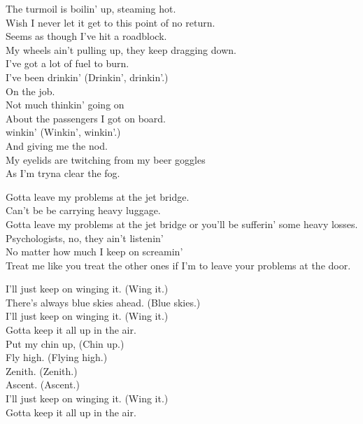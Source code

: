 
The turmoil is boilin' up, steaming hot. \\
Wish I never let it get to this point of no return. \\
Seems as though I've hit a roadblock. \\
My wheels ain't pulling up, they keep dragging down. \\

I've got a lot of fuel to burn. \\
I've been drinkin' (Drinkin', drinkin'.) \\
On the job. \\
Not much thinkin' going on \\
About the passengers I got on board. \\
 winkin' (Winkin', winkin'.) \\
And giving me the nod. \\
My eyelids are twitching from my beer goggles \\
As I'm tryna clear the fog. \\


Gotta leave my problems at the jet bridge. \\
Can't be be carrying heavy luggage. \\
Gotta leave my problems at the jet bridge or you'll be sufferin' some heavy losses. \\
Psychologists, no, they ain't listenin' \\
No matter how much I keep on screamin' \\
Treat me like you treat the other ones if I'm to leave your problems at the door. \\


I'll just keep on winging it. (Wing it.) \\
There's always blue skies ahead. (Blue skies.) \\
I'll just keep on winging it. (Wing it.) \\
Gotta keep it all up in the air. \\
Put my chin up, (Chin up.) \\
Fly high. (Flying high.) \\
Zenith. (Zenith.) \\
Ascent. (Ascent.) \\
I'll just keep on winging it. (Wing it.) \\
Gotta keep it all up in the air. \\

